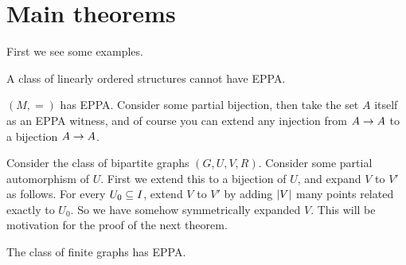 \documentclass{amsart}
\begin{document}
\section{Main theorems}

First we see some examples.

\begin{exm}
A class of linearly ordered structures cannot have EPPA.
\end{exm}

\begin{exm}
$\left( M , = \right)$ has EPPA.
Consider some partial bijection, then take the set $A$ itself as an EPPA witness,
and of course you can extend any injection from $A\rightarrow A$ to a bijection $A\rightarrow A$. 
\end{exm}

\begin{exm}
Consider the class of bipartite graphs $\left( G , U , V , R \right)$.
Consider some partial automorphism of $U$. First we extend this to a bijection of $U$, and
expand $V$ to $V'$ as follows.
For every $U_0 \subseteq I$, extend $V$ to $V'$ by adding $\left| V \right|$ many points related
exactly to $U_0$. So we have somehow symmetrically expanded $V$. This will be motivation
for the proof of the next theorem.
\end{exm}

\begin{thm}
The class of finite graphs has EPPA.
\end{thm}
\end{document}
